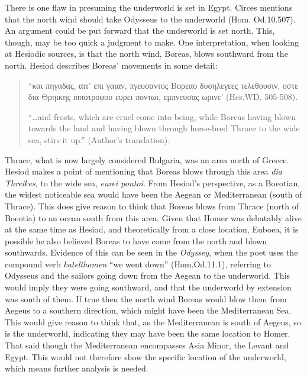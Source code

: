 	
	
	
	There is one flaw in presuming the underworld is set in Egypt. Circes mentions that the north wind should take Odysseus to the underworld (Hom. Od.10.507). An argument could be put forward that the underworld is set north. This, though, may be too quick a judgment to make. One interpretation, when looking at Hesiodic sources, is that the north wind, Boreas, blows southward from the north. Hesiod describes Boreas’ movements in some detail:
	
	\begin{quote}
	
	“και πηγαδας, αιτ’ επι γαιαν, πγευσαντος Βορεαο δυσηλεγεες τελεθουσιν,
	οστε δια Θρηικης ιπποτροφου ευρει ποντωι,
	εμπνευσας ωρινε’  (Hes.WD. 505-508).
	
	“…and frosts, which are cruel come into being, while Boreas having blown towards the land and having blown through horse-bred Thrace to the wide sea, stirs it up.” (Author’s translation).
	
	\end{quote}
	
	Thrace, what is now largely considered Bulgaria, was an area north of Greece. Hesiod makes a point of mentioning that Boreas blows through this area \emph{dia Threikes}, to the wide sea, \emph{eurei pontoi}. From Hesiod’s perspective, as a Boeotian, the widest noticeable sea would have been the Aegean or Mediterranean (south of Thrace). This does give reason to think that Boreas blows from Thrace (north of Boeotia) to an ocean south from this area. Given that Homer was debatably alive at the same time as Hesiod, and theoretically from a close location, Euboea, it is possible he also believed Boreas to have come from the north and blown southwards. Evidence of this can be seen in the \emph{Odyssey}, when the poet uses the compound verb \emph{katelthomen} “we went down” (Hom.Od.11.1), referring to Odysseus and the sailors going down from the Aegean to the underworld. This would imply they were going southward, and that the underworld by extension was south of them. If true then the north wind Boreas would blow them from Aegeus to a southern direction, which might have been the Mediterranean Sea. This would give reason to think that, as the Mediterranean is south of Aegeus, so is the underworld, indicating they may have been the same location to Homer. That said though the Mediterranean encompasses Asia Minor, the Levant and Egypt. This would not therefore show the specific location of the underworld, which means further analysis is needed.
	
